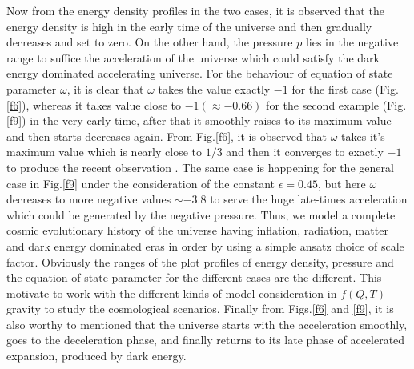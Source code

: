 \documentclass[showpacs,aps,amssymb,preprintnumbers,prd,amsmath,floatfix]{revtex4}
\def \e{\epsilon}
\def \o{\omega}
\begin{document}
Now from the energy density profiles in the two cases, it is observed that the energy density is high in the early time of the universe and then gradually decreases and set to zero. On the other hand, the pressure $p$ lies in the negative range to suffice the acceleration of the universe which could satisfy the dark energy dominated accelerating universe. For the behaviour of equation of state parameter $\o$, it is clear that $\o$ takes the value exactly $-1$ for the first case (Fig.\ref{f6}), whereas it takes value close to $-1(\approx -0.66)$ for the second example (Fig.\ref{f9}) in the very early time, after that it smoothly raises to its maximum value and then starts decreases again. From Fig.\ref{f6}, it is observed that $\o$ takes it's maximum value which is nearly close to $1/3$ and then it converges to exactly $-1$ to produce the recent observation \cite{Riess1,Perlmutter1,Perlmutter2,Spergel1,Komatsu}. The same case is happening for the general case in Fig.\ref{f9} under the consideration of the constant $\e=0.45$, but here $\o$ decreases to more negative values $\sim -3.8$ to serve the huge late-times acceleration which could be generated by the negative pressure. Thus, we model a complete cosmic evolutionary history of the universe having inflation, radiation, matter and dark energy dominated eras in order by using a simple ansatz choice of scale factor. Obviously the ranges of the plot profiles of energy density, pressure and the equation of state parameter for the different cases are the different. This motivate to work with the different kinds of model consideration in $f(Q,T)$ gravity to study the cosmological scenarios. Finally from Figs.\ref{f6} and \ref{f9}, it is also worthy to mentioned that the universe starts with the acceleration smoothly, goes to the deceleration phase, and finally returns to its late phase of accelerated expansion, produced by dark energy.
\end{document}
